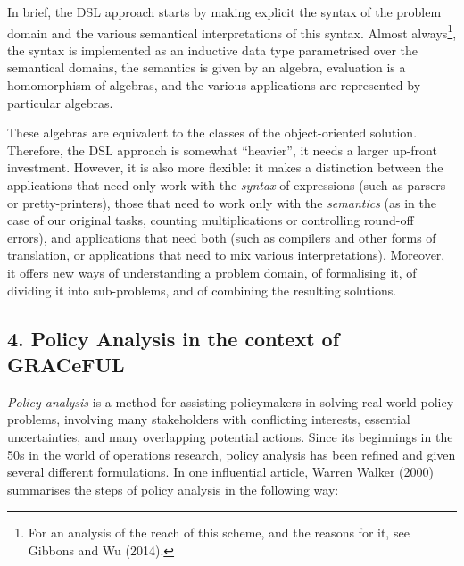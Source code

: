 \documentclass[]{article}
\begin{document}
In brief, the DSL approach starts by making explicit the syntax of the
problem domain and the various semantical interpretations of this
syntax. Almost always\footnote{For an analysis of the reach of this
  scheme, and the reasons for it, see Gibbons and Wu (2014).}, the
syntax is implemented as an inductive data type parametrised over the
semantical domains, the semantics is given by an algebra, evaluation is
a homomorphism of algebras, and the various applications are represented
by particular algebras.

These algebras are equivalent to the classes of the object-oriented
solution. Therefore, the DSL approach is somewhat ``heavier'', it needs
a larger up-front investment. However, it is also more flexible: it
makes a distinction between the applications that need only work with
the \emph{syntax} of expressions (such as parsers or pretty-printers),
those that need to work only with the \emph{semantics} (as in the case
of our original tasks, counting multiplications or controlling round-off
errors), and applications that need both (such as compilers and other
forms of translation, or applications that need to mix various
interpretations). Moreover, it offers new ways of understanding a
problem domain, of formalising it, of dividing it into sub-problems, and
of combining the resulting solutions.

\subsection{4. Policy Analysis in the context of
GRACeFUL}\label{policy-analysis-in-the-context-of-graceful}

\emph{Policy analysis} is a method for assisting policymakers in solving
real-world policy problems, involving many stakeholders with conflicting
interests, essential uncertainties, and many overlapping potential
actions. Since its beginnings in the 50s in the world of operations
research, policy analysis has been refined and given several different
formulations. In one influential article, Warren Walker (2000)
summarises the steps of policy analysis in the following way:
\end{document}

